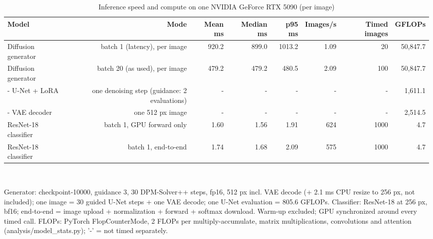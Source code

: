 \begin{table}[t]
\centering
\footnotesize
\caption{Inference speed and compute on one NVIDIA GeForce RTX 5090 (per image)}
\label{tab:t13_inference_speed}
\begin{tabular}{lrrrrrrr}
\toprule
Model & Mode & Mean ms & Median ms & p95 ms & Images/s & Timed images & GFLOPs \\
\midrule
Diffusion generator & batch 1 (latency), per image & 920.2 & 899.0 & 1013.2 & 1.09 & 20 & 50,847.7 \\
Diffusion generator & batch 20 (as used), per image & 479.2 & 479.2 & 480.5 & 2.09 & 100 & 50,847.7 \\
- U-Net + LoRA & one denoising step (guidance: 2 evaluations) & - & - & - & - & - & 1,611.1 \\
- VAE decoder & one 512 px image & - & - & - & - & - & 2,514.5 \\
ResNet-18 classifier & batch 1, GPU forward only & 1.60 & 1.56 & 1.91 & 624 & 1000 & 4.7 \\
ResNet-18 classifier & batch 1, end-to-end & 1.74 & 1.68 & 2.09 & 575 & 1000 & 4.7 \\
\bottomrule
\end{tabular}
\\[2pt]\parbox{\linewidth}{\scriptsize Generator: checkpoint-10000, guidance 3, 30 DPM-Solver++ steps, fp16, 512 px incl. VAE decode (+ 2.1 ms CPU resize to 256 px, not included); one image = 30 guided U-Net steps + one VAE decode; one U-Net evaluation = 805.6 GFLOPs. Classifier: ResNet-18 at 256 px, bf16; end-to-end = image upload + normalization + forward + softmax download. Warm-up excluded; GPU synchronized around every timed call. FLOPs: PyTorch FlopCounterMode, 2 FLOPs per multiply-accumulate, matrix multiplications, convolutions and attention (analysis/model\_stats.py); '-' = not timed separately.}
\end{table}
